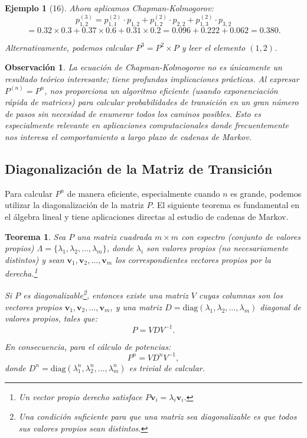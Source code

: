 \documentclass[12pt]{book}
\newtheorem{theorem}{Teorema}[chapter]
\newtheorem{example}{Ejemplo}[chapter]
\newtheorem{remark}{Observación}[chapter]
\begin{document}
\begin{example}[16]
Ahora aplicamos Chapman-Kolmogorov:
\[
p_{1,2}^{(3)} = p_{1,1}^{(2)} \cdot p_{1,2} + p_{1,2}^{(2)} \cdot p_{2,2} + p_{1,3}^{(2)} \cdot p_{3,2}
\]
\[
= 0.32 \times 0.3 + 0.37 \times 0.6 + 0.31 \times 0.2 = 0.096 + 0.222 + 0.062 = 0.380.
\]

Alternativamente, podemos calcular $P^3 = P^2 \times P$ y leer el elemento $(1,2)$.
\end{example}

\begin{remark}
La ecuación de Chapman-Kolmogorov no es únicamente un resultado teórico interesante; tiene profundas implicaciones prácticas. Al expresar $P^{(n)} = P^n$, nos proporciona un algoritmo eficiente (usando exponenciación rápida de matrices) para calcular probabilidades de transición en un gran número de pasos sin necesidad de enumerar todos los caminos posibles. Esto es especialmente relevante en aplicaciones computacionales donde frecuentemente nos interesa el comportamiento a largo plazo de cadenas de Markov.
\end{remark}

\subsection*{Diagonalización de la Matriz de Transición}

Para calcular $P^n$ de manera eficiente, especialmente cuando $n$ es grande, podemos utilizar la diagonalización de la matriz $P$. El siguiente teorema es fundamental en el álgebra lineal y tiene aplicaciones directas al estudio de cadenas de Markov.

\begin{theorem}
Sea $P$ una matriz cuadrada $m \times m$ con espectro (conjunto de valores propios) $\Lambda = \{\lambda_1, \lambda_2, \ldots, \lambda_m\}$, donde $\lambda_i$ son valores propios (no necesariamente distintos) y sean $\mathbf{v}_1, \mathbf{v}_2, \ldots, \mathbf{v}_m$ los correspondientes vectores propios por la derecha.\footnote{Un vector propio derecho satisface $P \mathbf{v}_i = \lambda_i \mathbf{v}_i$.}

Si $P$ es diagonalizable\footnote{Una condición suficiente para que una matriz sea diagonalizable es que todos sus valores propios sean distintos.}, entonces existe una matriz $V$ cuyas columnas son los vectores propios $\mathbf{v}_1, \mathbf{v}_2, \ldots, \mathbf{v}_m$, y una matriz $D = \text{diag}(\lambda_1, \lambda_2, \ldots, \lambda_m)$ diagonal de valores propios, tales que:
\[
P = V D V^{-1}.
\]

En consecuencia, para el cálculo de potencias:
\[
P^n = V D^n V^{-1},
\]
donde $D^n = \text{diag}(\lambda_1^n, \lambda_2^n, \ldots, \lambda_m^n)$ es trivial de calcular.
\end{theorem}
\end{document}
